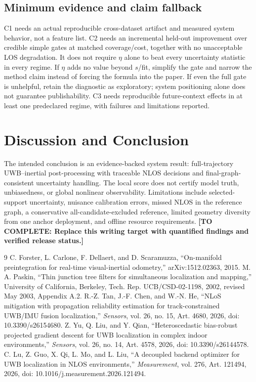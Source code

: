 \documentclass[conference]{IEEEtran}
\newcommand{\todo}[1]{\textcolor{red!70!black}{\textbf{[TO COMPLETE: #1]}}}
\begin{document}
\subsection{Minimum evidence and claim fallback}
C1 needs an actual reproducible cross-dataset artifact and measured system behavior, not a feature list. C2 needs an incremental held-out improvement over credible simple gates at matched coverage/cost, together with no unacceptable LOS degradation. It does not require $\eta$ alone to beat every uncertainty statistic in every regime. If $\eta$ adds no value beyond $s$/fit, simplify the gate and narrow the method claim instead of forcing the formula into the paper. If even the full gate is unhelpful, retain the diagnostic as exploratory; system positioning alone does not guarantee publishability. C3 needs reproducible future-context effects in at least one predeclared regime, with failures and limitations reported.

\section{Discussion and Conclusion}
\label{sec:conclusion}
The intended conclusion is an evidence-backed system result: full-trajectory UWB--inertial post-processing with traceable NLOS decisions and final-graph-consistent uncertainty handling. The local score does not certify model truth, unbiasedness, or global nonlinear observability. Limitations include selected-support uncertainty, nuisance calibration errors, missed NLOS in the reference graph, a conservative all-candidate-excluded reference, limited geometry diversity from one anchor deployment, and offline resource requirements. \todo{Replace this writing target with quantified findings and verified release status.}

\begin{thebibliography}{9}
C. Forster, L. Carlone, F. Dellaert, and D. Scaramuzza,
``On-manifold preintegration for real-time visual-inertial odometry,''
arXiv:1512.02363, 2015.
M. A. Paskin, ``Thin junction tree filters for simultaneous localization and mapping,''
University of California, Berkeley, Tech. Rep. UCB/CSD-02-1198,
2002, revised May 2003, Appendix A.2.
R.-Z. Tan, J.-F. Chen, and W.-N. He,
``NLoS mitigation with propagation reliability estimation for track-constrained UWB/IMU fusion localization,''
\emph{Sensors}, vol. 26, no. 15, Art. 4680, 2026,
doi: 10.3390/s26154680.
Z. Yu, Q. Liu, and Y. Qian,
``Heteroscedastic bias-robust projected gradient descent for UWB localization in complex indoor environments,''
\emph{Sensors}, vol. 26, no. 14, Art. 4578, 2026,
doi: 10.3390/s26144578.
C. Lu, Z. Guo, X. Qi, L. Mo, and L. Liu,
``A decoupled backend optimizer for UWB localization in NLOS environments,''
\emph{Measurement}, vol. 276, Art. 121494, 2026,
doi: 10.1016/j.measurement.2026.121494.
\end{thebibliography}
\end{document}
